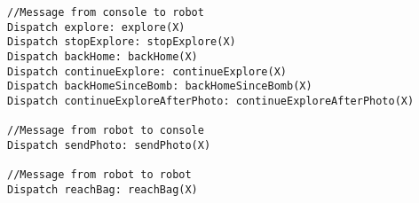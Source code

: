     \begin{lstlisting}
//Message from console to robot
Dispatch explore: explore(X)
Dispatch stopExplore: stopExplore(X)
Dispatch backHome: backHome(X)
Dispatch continueExplore: continueExplore(X)
Dispatch backHomeSinceBomb: backHomeSinceBomb(X)
Dispatch continueExploreAfterPhoto: continueExploreAfterPhoto(X)

//Message from robot to console
Dispatch sendPhoto: sendPhoto(X)

//Message from robot to robot
Dispatch reachBag: reachBag(X)

    \end{lstlisting}